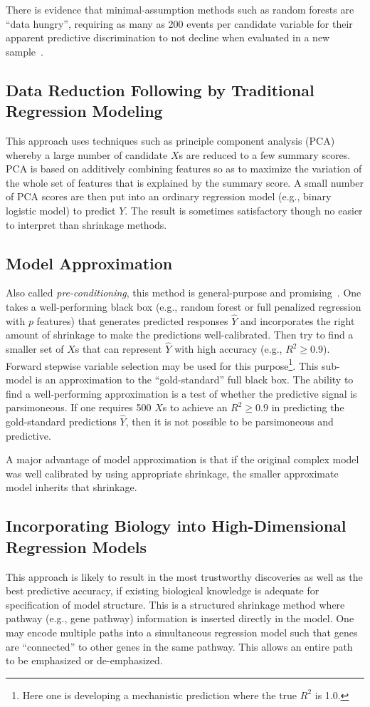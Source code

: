 There is evidence that minimal-assumption methods such as random
forests are ``data hungry'', requiring as many as 200 events per
candidate variable for their apparent predictive discrimination to not
decline when evaluated in a new sample~\cite{plo14mod}.

\subsection{Data Reduction Following by Traditional Regression Modeling}
This approach uses techniques such as principle component analysis (PCA) whereby a large number of candidate $X$s are reduced to a few summary scores.  PCA is based on additively combining features so as to maximize the variation of the whole set of features that is explained by the summary score.  A small number of PCA scores are then put into an ordinary regression model (e.g., binary logistic model) to predict $Y$.  The result is sometimes satisfactory though no easier to interpret than shrinkage methods.

\subsection{Model Approximation}
Also called \emph{pre-conditioning}, this method is general-purpose and promising~\cite{pau08pre,she04inf,amb02sim}.  One takes a well-performing black box (e.g., random forest or full penalized regression with $p$ features) that generates predicted responses $\hat{Y}$ and incorporates the right amount of shrinkage to make the predictions well-calibrated.  Then try to find a smaller set of $X$s that can represent $\hat{Y}$ with high accuracy (e.g., $R^{2} \geq 0.9$).  Forward stepwise variable selection may be used for this purpose\footnote{Here one is developing a mechanistic prediction where the true $R^{2}$ is 1.0.}. This sub-model is an approximation to the ``gold-standard'' full black box.  The ability to find a well-performing approximation is a test of whether the predictive signal is parsimoneous.  If one requires 500 $X$s to achieve an $R^{2} \geq 0.9$ in predicting the gold-standard predictions $\hat{Y}$, then it is not possible to be parsimoneous and predictive.

A major advantage of model approximation is that if the original complex model was well calibrated by using appropriate shrinkage, the smaller approximate model inherits that shrinkage.

\subsection{Incorporating Biology into High-Dimensional Regression Models}
This approach is likely to result in the most trustworthy discoveries as well as the best predictive accuracy, if existing biological knowledge is adequate for specification of model structure.  This is a structured shrinkage method where pathway (e.g., gene pathway) information is inserted directly in the model.  One may encode multiple paths into a simultaneous regression model such that genes are ``connected'' to other genes in the same pathway.  This allows an
  entire path to be emphasized or de-emphasized.

